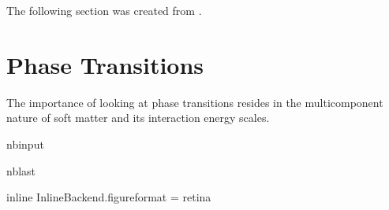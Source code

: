 \documentclass[letterpaper,10pt,english]{sphinxmanual}
\begin{document}
\sphinxAtStartPar
The following section was created from .


\chapter{Phase Transitions}
\label{\detokenize{notebooks/L5/1_Phase_Transitions:Phase-Transitions}}\label{\detokenize{notebooks/L5/1_Phase_Transitions::doc}}
\sphinxAtStartPar
The importance of looking at phase transitions resides in the multicomponent nature of soft matter and its interaction energy scales.

\begin{sphinxuseclass}{nbinput}
\begin{sphinxuseclass}{nblast}
{
\begin{sphinxVerbatim}[commandchars=\\\{\}]
\llap{\color{nbsphinxin}[5]:\,\hspace{\fboxrule}\hspace{\fboxsep}}   
      
   
   

 inline
 InlineBackend.figure\PYGZus{}format = \PYGZsq{}retina\PYGZsq{}


\end{sphinxVerbatim}}
\end{sphinxuseclass}
\end{sphinxuseclass}
\end{document}
